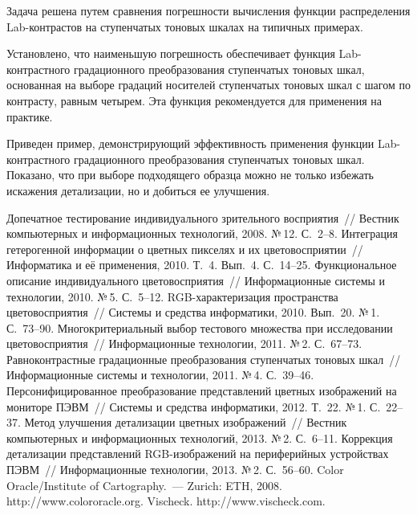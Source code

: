 \begin{multicols}{2}
  Задача решена путем сравнения погрешности вычисления функции 
распределения Lab-конт\-рас\-тов на ступенчатых тоновых шкалах на 
типичных примерах. 
  
  Установлено, что наименьшую погрешность обеспечивает функция 
  Lab-конт\-раст\-но\-го градационного преобразования ступенчатых тоновых 
шкал, основанная на выборе градаций носителей ступенчатых тоновых шкал с 
шагом по контрасту, равным четырем. Эта функция рекомендуется для 
применения на практике. 
  
  Приведен пример, демонстрирующий эффективность применения функции 
Lab-конт\-раст\-но\-го градационного преобразования ступенчатых тоновых 
шкал. Показано, что при выборе подходящего образца можно не только 
избежать искажения детализации, но и добиться ее улучшения.
  
{\small\frenchspacing
{%
\begin{thebibliography}{99}
 Допечатное тестирование индивидуального 
зрительного восприятия~// Вестник компьютерных и информационных 
технологий, 2008. №\,12. С.~2--8.
 Интеграция гетерогенной информации о 
цветных пикселях и их цветовосприятии~// Информатика и её применения, 
2010. Т.~4. Вып.~4. С.~14--25.
 Функциональное описание индивидуального 
цветовосприятия~// Информационные сис\-те\-мы и технологии, 2010. №\,5. 
С.~5--12.
 RGB-ха\-рак\-те\-ри\-за\-ция пространства 
цветовосприятия~// Сис\-те\-мы и сред\-ст\-ва информатики, 
2010. Вып.~20. №\,1. С.~73--90.
 Многокритериальный выбор тестового 
множества при исследовании цветовосприятия~// Информационные 
технологии, 2011. №\,2. С.~67--73.
 Равноконтрастные градационные 
преобразования ступенчатых тоновых шкал~// Информационные сис\-те\-мы и 
технологии, 2011. №\,4. С.~39--46. 
 Персонифицированное преобразование 
пред\-став\-ле\-ний цвет\-ных изоб\-ра\-же\-ний на мониторе ПЭВМ~// 
Сис\-те\-мы и средства информатики, 2012. Т.~22. №\,1. С.~22--37.
 Метод улучшения детализации цветных 
изображений~// Вестник компьютерных и информационных технологий, 2013. 
№\,2. С.~6--11.
 Коррекция детализации представлений 
RGB-изоб\-ра\-же\-ний на периферийных устройствах ПЭВМ~// 
Информационные технологии, 2013. №\,2. С.~56--60.
Color Oracle/Institute of Cartography.~--- Zurich: ETH, 2008. {\sf 
http://www.colororacle.org}.
Vischeck. {\sf http://www.vischeck.com}. 
\end{thebibliography} } }



\end{multicols}

